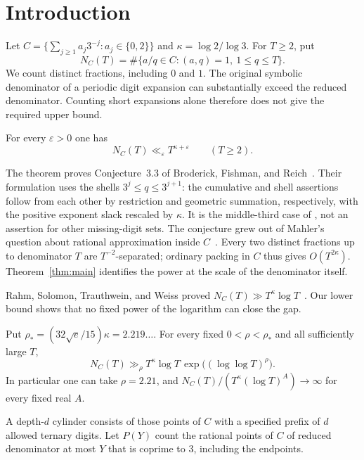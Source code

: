 \section{Introduction}

Let \(C=\{\sum_{j\ge1} a_j3^{-j}:a_j\in\{0,2\}\}\) and
\(\kappa=\log 2/\log 3\). For \(T\ge2\), put
\[
 N_C(T)=\#\{a/q\in C:(a,q)=1,\ 1\le q\le T\}.
\]
We count distinct fractions, including \(0\) and \(1\). The original
symbolic denominator of a periodic digit expansion can substantially
exceed the reduced denominator. Counting short expansions alone therefore
does not give the required upper bound.

\begin{theorem}\label{thm:main}
For every \(\varepsilon>0\) one has
\[
                 N_C(T)\ll_\varepsilon T^{\kappa+\varepsilon}
                 \qquad(T\ge2).
\]
\end{theorem}

The theorem proves Conjecture~3.3 of Broderick, Fishman, and
Reich~\cite{BFR2011}. Their formulation uses the shells
\(3^j\le q\le3^{j+1}\): the cumulative and shell assertions follow
from each other by restriction and geometric summation, respectively,
with the positive exponent slack rescaled by \(\kappa\). It is the
middle-third case of \cite[Conjecture~1.1]{CVY2026}, not an assertion
for other missing-digit sets. The conjecture grew out of
Mahler's question about rational approximation inside \(C\)~\cite{Mahler1984}.
Every two distinct fractions up to denominator \(T\) are \(T^{-2}\)-separated;
ordinary packing in \(C\) thus gives \(O(T^{2\kappa})\). Theorem~\ref{thm:main}
identifies the power at the scale of the denominator itself.

Rahm, Solomon, Trauthwein, and Weiss proved
\(N_C(T)\gg T^\kappa\log T\)~\cite[Proposition~3.3]{RSTW2020}. Our
lower bound shows that no fixed power of the logarithm can close the gap.

\begin{theorem}\label{thm:lower}
Put \(\rho_*=(32\sqrt e/15)\kappa=2.219\ldots\). For every fixed
\(0<\rho<\rho_*\) and all sufficiently large \(T\),
\[
 N_C(T)\gg_\rho T^\kappa\log T\,\exp\big((\log\log T)^\rho\big).
\]
In particular one can take \(\rho=2.21\), and
\(N_C(T)/(T^\kappa(\log T)^A)\to\infty\) for every fixed real \(A\).
\end{theorem}

A depth-\(d\) cylinder consists of those points of \(C\) with a
specified prefix of \(d\) allowed ternary digits. Let \(P(Y)\) count
the rational points of \(C\) of reduced denominator at most \(Y\)
that is coprime to \(3\), including the endpoints.

